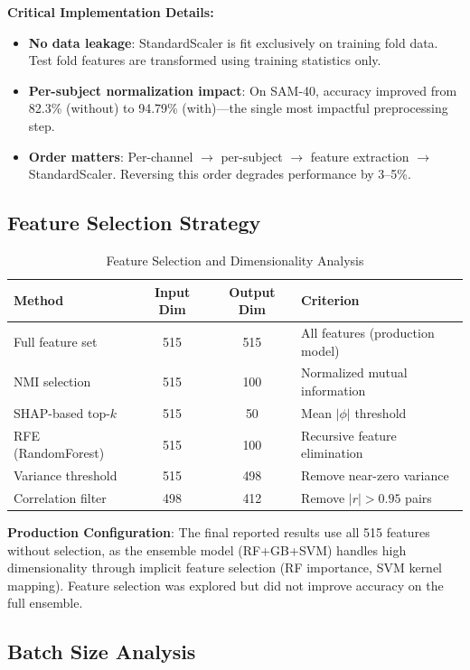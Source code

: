 \documentclass[11pt,a4paper]{article}
\begin{document}
\noindent\textbf{Critical Implementation Details:}
\begin{itemize}[leftmargin=*]
\item \textbf{No data leakage}: StandardScaler is fit exclusively on training fold data. Test fold features are transformed using training statistics only.
\item \textbf{Per-subject normalization impact}: On SAM-40, accuracy improved from 82.3\% (without) to 94.79\% (with)---the single most impactful preprocessing step.
\item \textbf{Order matters}: Per-channel $\to$ per-subject $\to$ feature extraction $\to$ StandardScaler. Reversing this order degrades performance by 3--5\%.
\end{itemize}

\subsection{Feature Selection Strategy}

\begin{table}[H]
\centering
\caption{Feature Selection and Dimensionality Analysis}
\small
\begin{tabular}{lccl}
\toprule
\textbf{Method} & \textbf{Input Dim} & \textbf{Output Dim} & \textbf{Criterion} \\
\midrule
Full feature set & 515 & 515 & All features (production model) \\
NMI selection & 515 & 100 & Normalized mutual information \\
SHAP-based top-$k$ & 515 & 50 & Mean $|\phi|$ threshold \\
RFE (RandomForest) & 515 & 100 & Recursive feature elimination \\
\midrule
Variance threshold & 515 & 498 & Remove near-zero variance \\
Correlation filter & 498 & 412 & Remove $|r| > 0.95$ pairs \\
\bottomrule
\end{tabular}
\end{table}

\noindent\textbf{Production Configuration}: The final reported results use all 515 features without selection, as the ensemble model (RF+GB+SVM) handles high dimensionality through implicit feature selection (RF importance, SVM kernel mapping). Feature selection was explored but did not improve accuracy on the full ensemble.

\subsection{Batch Size Analysis}
\end{document}
